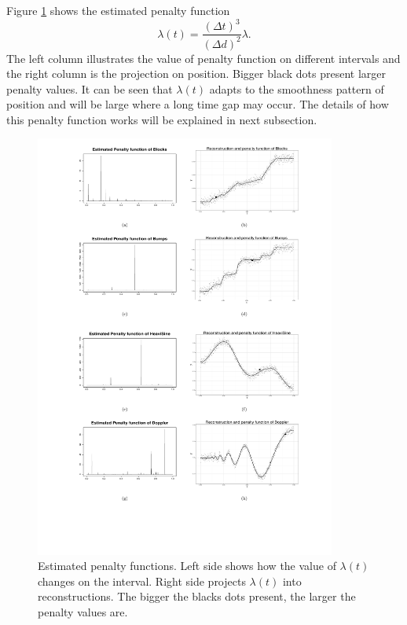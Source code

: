 Figure \ref{numpenalty} shows the estimated penalty function
\begin{equation}
\lambda(t)=\frac{(\Delta t)^3}{(\Delta d)^2}\lambda.
\end{equation}
The left column illustrates the value of penalty function on different intervals and the right column is the projection on position. Bigger black dots present larger penalty values. It can be seen that $\lambda(t)$ adapts to the smoothness pattern of position and will be large where a long time gap may occur. The details of how this penalty function works will be explained in next subsection.

\begin{figure}
  \centering
         \includegraphics[width=\textwidth,height=14cm]{Chapters/2.TractorSplineTheory/plot/penalty08} 
  \caption{Estimated penalty functions. Left side shows how the value of $\lambda(t)$ changes on the interval. Right side projects $\lambda(t)$ into reconstructions. The bigger the blacks dots present, the larger the penalty values are.}\label{numpenalty}
\end{figure}


